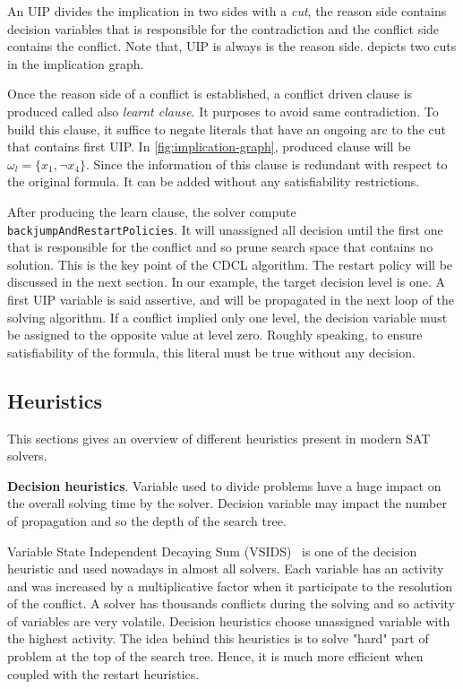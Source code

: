 An UIP divides the implication in two sides with a \emph{cut}, the reason side contains decision variables 
that is responsible for the contradiction and the conflict side contains the conflict. Note that, UIP is always is the 
reason side.  depicts two cuts in the implication graph.

Once the reason side of a conflict is established, a conflict driven clause is produced called also 
\emph{learnt clause}. It purposes to avoid same contradiction. To build this clause, it suffice to negate 
literals that have an ongoing arc to the cut that contains first UIP. In \cref{fig:implication-graph}, produced
clause will be $\omega_l = \{x_1, \neg x_4 \}$. Since the information of this clause is redundant with respect to 
the original formula. It can be added without any satisfiability restrictions. 

After producing the learn clause, the solver compute \texttt{backjumpAndRestartPolicies}. It will unassigned all
decision until the first one that is responsible for the conflict and so prune search space that contains no solution.
This is the key point of the CDCL algorithm. The restart policy will be discussed in the next section.
In our example, the target decision level is one. A first UIP variable  is said assertive, and will be propagated in the next loop of the solving algorithm.
If a conflict implied only one level, the decision variable must 
be assigned to the opposite value at level zero. Roughly speaking, to ensure satisfiability of the formula, this 
literal must be true without any decision.

 
\subsection{Heuristics}\label{sec:heuristics}
This sections gives an overview of different heuristics present in modern SAT solvers.

\textbf{Decision heuristics}. Variable used to divide problems have a huge impact on the 
overall solving time by the solver. Decision variable may impact the number of propagation and so 
the depth of the search tree.

Variable State Independent Decaying Sum (VSIDS)~\cite{moskewicz2001chaff} is one of the decision heuristic and used
nowadays in almost all solvers. Each variable has an activity and was increased by a multiplicative factor 
when it participate to the resolution of the conflict.
A solver has thousands conflicts during the solving and so activity of variables are very volatile.
Decision heuristics choose unassigned variable with the highest activity.
The idea behind this heuristics is to solve "hard" part of problem at the top of the search tree.
Hence, it is much more efficient when coupled with the restart heuristics. 

